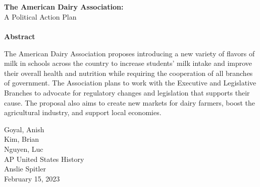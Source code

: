 \begin{titlepage}
\begin{center}




~\\[2.5cm]

\HRule \\[0.4cm]
{ \Large \bfseries The American Dairy Association:}\\
{   A Political Action Plan}\\[0.4cm]

\HRule \\[0.5cm]





\textbf{Abstract} \\

\begin{flushleft}
\begin{spacing}{1.0}

{\small
The American Dairy Association proposes introducing a new variety of flavors of milk in schools across the country to increase students' milk intake and improve their overall health and nutrition while requiring the cooperation of all branches of government. The Association plans to work with the Executive and Legislative Branches to advocate for regulatory changes and legislation that supports their cause. The proposal also aims to create new markets for dairy farmers, boost the agricultural industry, and support local economies.}\\

\end{spacing}
\end{flushleft}

\vfill

\begin{flushright}
\small {Goyal, Anish \\
Kim, Brian \\
Nguyen, Luc \\}
\large AP United States History \\
\large Anslie Spitler\\
{\large February 15, 2023}
\end{flushright}


\end{center}
\end{titlepage}